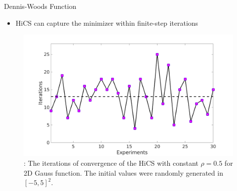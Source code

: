 \documentclass{beamer}
\begin{document}
\begin{frame}{Dennis-Woods Function}
\normalsize{
	\begin{itemize}
		\item HiCS can capture the minimizer within finite-step iterations
	\end{itemize}
	}
\begin{figure}[!htbp]
	\centering
	  \includegraphics[scale=0.22]{./figures/dwoodrand.png}
	\caption{:
\footnotesize{
	The iterations of convergence of the HiCS with
	constant $\rho=0.5$ for 2D Gauss function. The initial
	values were randomly generated in $[-5,5]^2$.}
}
\label{fig:dwfunrand}
\end{figure}
\end{frame}

%
\end{document}
